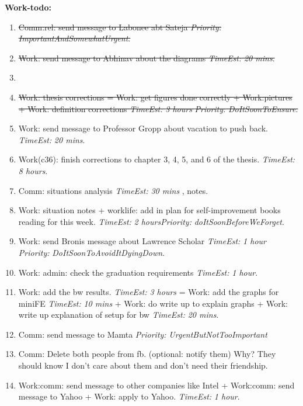 \documentclass[serif, mathserif, final]{beamer}
\newcommand{\doneTask}[1]{\item \sout{\small #1}}
\newcommand{\te}[1]{\textit{TimeEst:} \textit{#1}}
\newcommand{\priority}[1]{\textit{Priority:} \textit{#1}}
\newcommand{\prio}[1]{\textit{Priority:} \textit{#1}}
\begin{document}
\textbf{Work-todo:}\\ 
\begin{enumerate} 

\doneTask{ Comm:rel: send message to Labonee abt Sateja
  \priority{ImportantAndSomewhatUrgent}.} 

\doneTask{ Work: send message to Abhinav about the diagrams \te{20
    mins}. } 

\item \doneTask{Work: thesis corrections = Work: get figures done correctly +
  Work:pictures + Work: definition corrections \te{3 hours}
  \prio{DoItSoonToEnsure}. } 


\item Work: send message to Professor Gropp about vacation to push
  back. \te{20 mins}. 

\item Work(c36): finish corrections to chapter 3, 4, 5, and 6 of the
  thesis. \te{8 hours}. 
 
\item Comm: situations analysis \te{ 30 mins }, notes. 

\item Work: situation notes + worklife: add in plan for
  self-improvement books reading for this week.  \te{2
    hours}\prio{doItSoonBeforeWeForget}. 

\item Work: send Bronis message about Lawrence Scholar \te{1 hour}
  \prio{DoItSoonToAvoidItDyingDown}. 

\item Work: admin: check the graduation requirements \te{1 hour}.

\item Work: add the bw results. \te{3 hours}  =  Work: add the graphs
  for miniFE \te{10 mins}   +  Work: do write up to explain graphs +
  Work: write up explanation of setup for bw  \te{20 mins}. 



\item Comm: send message to Mamta  \priority{UrgentButNotTooImportant} 

\item Comm: Delete both people from fb. (optional: notify them) Why?
 They should know I don't care about them and don't need their
 friendship. 

\item Work:comm: send message to other companies like Intel  +
  Work:comm: send message to Yahoo + Work: apply to Yahoo. \te{1
    hour}.  

\end{enumerate}
 
\end{document}
